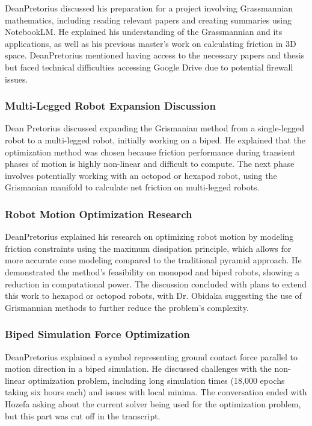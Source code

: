 DeanPretorius discussed his preparation for a project involving Grassmannian mathematics, including reading relevant papers and creating summaries using NotebookLM. He explained his understanding of the Grassmannian and its applications, as well as his previous master's work on calculating friction in 3D space. DeanPretorius mentioned having access to the necessary papers and thesis but faced technical difficulties accessing Google Drive due to potential firewall issues.

\subsubsection{Multi-Legged Robot Expansion Discussion}

Dean Pretorius discussed expanding the Grismanian method from a single-legged robot to a multi-legged robot, initially working on a biped. He explained that the optimization method was chosen because friction performance during transient phases of motion is highly non-linear and difficult to compute. The next phase involves potentially working with an octopod or hexapod robot, using the Grismanian manifold to calculate net friction on multi-legged robots.

\subsubsection{Robot Motion Optimization Research}

DeanPretorius explained his research on optimizing robot motion by modeling friction constraints using the maximum dissipation principle, which allows for more accurate cone modeling compared to the traditional pyramid approach. He demonstrated the method's feasibility on monopod and biped robots, showing a reduction in computational power. The discussion concluded with plans to extend this work to hexapod or octopod robots, with Dr. Obidaka suggesting the use of Grismannian methods to further reduce the problem's complexity.

\subsubsection{Biped Simulation Force Optimization}

DeanPretorius explained a symbol representing ground contact force parallel to motion direction in a biped simulation. He discussed challenges with the non-linear optimization problem, including long simulation times (18,000 epochs taking six hours each) and issues with local minima. The conversation ended with Hozefa asking about the current solver being used for the optimization problem, but this part was cut off in the transcript.

